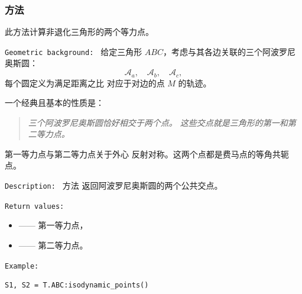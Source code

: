 \begin{tkzexample}[latex=.5\textwidth]
\begin{center}
\end{center}
\end{tkzexample}

\subsubsection{方法 }
\label{ssub:isodynamic_points}

此方法计算非退化三角形的两个等力点。

\medskip

\texttt{Geometric background: }
给定三角形 $ABC$，考虑与其各边关联的三个阿波罗尼奥斯圆：
\[
\mathcal{A}_{a},\quad \mathcal{A}_{b},\quad \mathcal{A}_{c},
\]
每个圆定义为满足距离之比
对应于对边的点 $M$ 的轨迹。

一个经典且基本的性质是：

\begin{quote}
\emph{三个阿波罗尼奥斯圆恰好相交于两个点。
这些交点就是三角形的第一和第二等力点。}
\end{quote}

第一等力点与第二等力点关于外心
反射对称。这两个点都是费马点的等角共轭点。

\medskip

\texttt{Description: }
方法  返回阿波罗尼奥斯圆的两个公共交点。

\medskip
\texttt{Return values: }
\begin{itemize}
  \item {} —— 第一等力点，
  \item {} —— 第二等力点。
\end{itemize}

\medskip
\texttt{Example: }
\begin{verbatim}
S1, S2 = T.ABC:isodynamic_points()
\end{verbatim}

